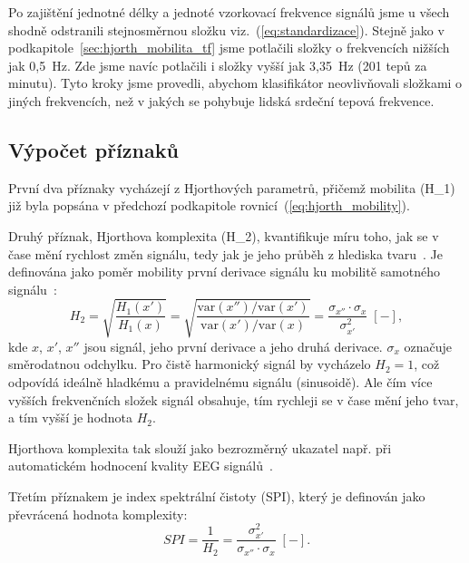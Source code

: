 Po zajištění jednotné délky a jednoté vzorkovací frekvence signálů jsme u všech shodně odstranili stejnosměrnou složku viz.~(\ref{eq:standardizace}).
Stejně jako v podkapitole~\ref{sec:hjorth_mobilita_tf} jsme potlačili složky o frekvencích nižších jak 0,5~Hz.
Zde jsme navíc potlačili i složky vyšší jak 3,35~Hz (201 tepů za minutu).
Tyto kroky jsme provedli, abychom klasifikátor neovlivňovali složkami o jiných frekvencích, než v jakých se pohybuje lidská srdeční tepová frekvence.

\subsection*{Výpočet příznaků}
První dva příznaky vycházejí z Hjorthových parametrů, přičemž mobilita (\acs{H_1}) již byla popsána v předchozí podkapitole rovnicí~(\ref{eq:hjorth_mobility}).

Druhý příznak, Hjorthova komplexita (\acs{H_2}), kvantifikuje míru toho, jak se v čase mění rychlost změn signálu, tedy jak  je jeho průběh z hlediska tvaru~\cite{Hjorth1970}.
Je definována jako poměr mobility první derivace signálu ku mobilitě samotného signálu~\cite{Geetika2022}:
\begin{equation}
	\label{eq:hjorth_complexity}
	H_{2} = \sqrt{ \frac{H_1(x')}{H_1(x)} }
	= \sqrt{ \frac{ \text{var}(x'') / \text{var}(x') }{ \text{var}(x') / \text{var}(x) } }
	= \frac{ \sigma_{x''} \cdot \sigma_{x} }{ \sigma_{x'}^2 } \; [-],
\end{equation}
kde $x$, $x'$, $x''$ jsou signál, jeho první derivace a jeho druhá derivace.
$\sigma_x$ označuje směrodatnou odchylku.
Pro čistě harmonický signál by vycházelo $H_2 = 1$, což odpovídá ideálně hladkému a pravidelnému signálu (sinusoidě).
Ale čím více vyšších frekvenčních složek signál obsahuje, tím rychleji se v čase mění jeho tvar, a tím vyšší je hodnota \( H_2 \). %

Hjorthova komplexita tak slouží jako bezrozměrný ukazatel např. při automatickém hodnocení kvality EEG signálů~\cite{Geetika2022}.

Třetím příznakem je index spektrální čistoty (\acs{SPI}), který je definován jako převrácená hodnota komplexity:
\begin{equation}
	\label{eq:hjorth_SPI}
	SPI = \frac{1}{H_2} = \frac{\sigma_{x'}^2}{\sigma_{x''} \cdot \sigma_{x}} \; [-].
\end{equation}

